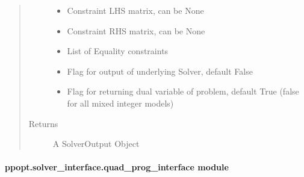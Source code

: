 \documentclass[letterpaper,10pt,english]{sphinxmanual}
\begin{document}
\begin{fulllineitems}
\begin{quote}
\begin{description}
\begin{itemize}
\item {} 
\sphinxAtStartPar
{} \textendash{} Constraint LHS matrix, can be None

\item {} 
\sphinxAtStartPar
{} \textendash{} Constraint RHS matrix, can be None

\item {} 
\sphinxAtStartPar
{} \textendash{} List of Equality constraints

\item {} 
\sphinxAtStartPar
{} \textendash{} Flag for output of underlying Solver, default False

\item {} 
\sphinxAtStartPar
{} \textendash{} Flag for returning dual variable of problem, default True (false for all mixed integer models)

\end{itemize}

\item[{Returns}] \leavevmode
\sphinxAtStartPar
A SolverOutput Object

\end{description}\end{quote}

\end{fulllineitems}



\paragraph{ppopt.solver\_interface.quad\_prog\_interface module}
\label{\detokenize{ppopt.solver_interface:module-ppopt.solver_interface.quad_prog_interface}}\label{\detokenize{ppopt.solver_interface:ppopt-solver-interface-quad-prog-interface-module}}
\end{document}
